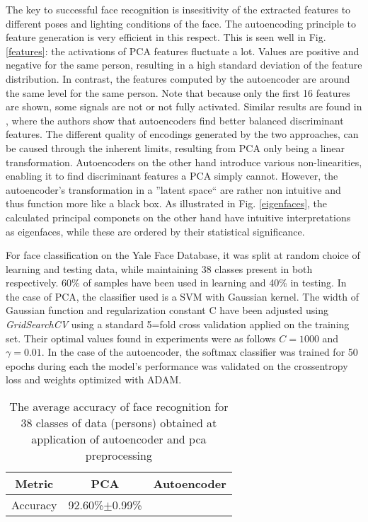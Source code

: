 The key to successful face recognition is insesitivity of the extracted features
to different poses and lighting conditions of the face. The autoencoding
principle to feature generation is very efficient in this respect. This is seen
well in Fig. \ref{features}: the activations of PCA features fluctuate a lot.
Values are positive and negative for the same person, resulting in a high
standard deviation of the feature distribution. In contrast, the features
computed by the autoencoder are around the same level for the same person. Note
that because only the first 16 features are shown, some signals are not or not
fully activated. Similar results are found in \cite{siwek2017autoencoder}, where
the authors show that autoencoders find better balanced discriminant features.
The different quality of encodings generated by the two approaches, can be
caused through the inherent limits, resulting from PCA only being a linear
transformation. Autoencoders on the other hand introduce various
non-linearities, enabling it to find discriminant features a PCA simply cannot.
However, the autoencoder's transformation in a ''latent space`` are rather non
intuitive and thus function more like a black box. As illustrated in Fig.
\ref{eigenfaces}, the calculated principal componets on the other hand have
intuitive interpretations as eigenfaces, while these are ordered by their
statistical significance.

For face classification on the Yale Face Database, it was split at random choice
of learning and testing data, while maintaining 38 classes present in both
respectively. 60\% of samples have been used in learning and 40\% in testing. In
the case of PCA, the classifier used is a SVM with Gaussian kernel. The width of
Gaussian function and regularization constant C have been adjusted using
\textit{GridSearchCV} using a standard 5=fold cross validation applied on the
training set. Their optimal values found in experiments were as follows $C=1000$
and $\gamma=0.01$. In the case of the autoencoder, the softmax classifier was
trained for 50 epochs during each the model's performance was validated on the
crossentropy loss and weights optimized with ADAM.

\begin{table}[h]
  \caption{The average accuracy of face recognition for 38 classes of data (persons) obtained at application of autoencoder and pca preprocessing}
  \begin{center}
  \begin{tabular}{|c|c|c|}
  \hline
  \textbf{Metric} & \textbf{PCA} & \textbf{Autoencoder} \\
  \hline
  Accuracy & 92.60\%$\pm$0.99\% & \\
  \hline
  \end{tabular}
  \label{scores}
  \end{center}
\end{table}
